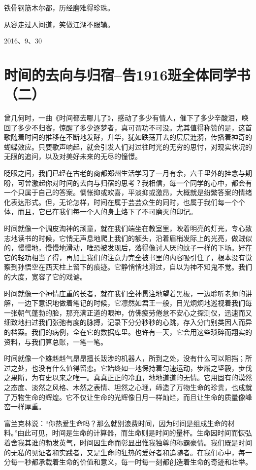 \documentclass[openany]{ctexbook}
\begin{document}
铁骨钢筋木尔都，历经磨难得珍珠。

从容走过人间道，笑傲江湖不服输。

2016、9、30

\chapter*{时间的去向与归宿--告1916班全体同学书（二）}\label{letter2}

曾几何时，一曲《时间都去哪儿了》，感动了多少有情人，催下了多少辛酸泪，唤回了多少不归客，惊醒了多少逐梦者，真可谓功不可没。尤其值得称赞的是，这首歌随着时间的推移在不断地发酵，升华，犹如跌荡开去的层层涟漪，传播着神奇的蝴蝶效应。只要歌声响起，就会引发人们对过往时光的无穷的思忖，对现实状况的无限的追问，以及对美好未来的无尽的憧憬。

眨眼之间，我们已经在古老的商都郑州生活学习了一月有余，六千里外的挂念与期盼，可曾激起你对时间的去向与归宿的思考？我相信，每一个同学的心中，都会有一个只属于自己的答案。惆怅抑或欢喜，平淡抑或激昂，大概就是纷繁答案的情绪化表达形式。但，无论怎样，时间在属于芸芸众生的同时，也属于我们每一个个体，而且，它已在我们每一个人的身上烙下了不可磨灭的印记。

时间就像一个调皮淘神的顽童，就在我们端坐在教室里，映着明亮的灯光，专心致志地读书的时候，它悄无声息地爬上我们的额头，沿着眉梢发际上的光亮，做贼似的，慢慢地，慢慢地滑动，唯恐被发现后，落得像讨人厌的蚊子一样的下场。好在它的轻功相当了得，再加上我们的注意力完全被书里的内容吸引住了，根本没有觉察到孙悟空在西天柱上留下的痕迹。它静悄悄地滑过，自以为神不知鬼不觉。我们的大度，宽容了它的戏谑。

时间就像一个神情庄重的长者，就在我们全神贯注地望着黑板，一边聆听老师的讲解，一边下意识地做着笔记的时候，它凛然如君王一般，目光炯炯地巡视着我们每一张朝气蓬勃的脸，那充满正道的眼神，仿佛疲劳倦怠不安心之探测仪，迅速而又细致地扫过我们张弛有度的脉搏，记录下分分秒秒的心跳，存入分门别类因人而异的档案。我们的病例，全在它的数据库里。也许有一天，它会用这些琐碎而翔实的资料，与我们算总账，一笔一笔。

时间就像一个雄赳赳气昂昂擅长跋涉的机器人，所到之处，没有什么可以阻挡；所过之处，也没有什么值得留恋。它始终如一地保持着匀速运动，步履之坚毅，步伐之果断，为有史以来之唯一。真真正正的冷血，地地道道的无情。它用固有的漠然之态度、淡然之风格、木然之表情、坦然之心理，缔造了万物生命的珍贵，也成就了万物生命的辉煌。它不仅让生命的光辉像日月一样灿烂，而且让生命的质量像峰峦一样厚重。

富兰克林说：``你热爱生命吗？那么就别浪费时间，因为时间是组成生命的材料。''由此可见，时间是生命的计算器，而生命则是时间的量杯。生命因时间而恢弘着舍我其谁的勃发英气，时间因生命而彰显出惟我独尊的称霸豪情。我们既是时间的无私的见证者和实践者，又是生命的狂热的爱好者和追随者。在我们心中，每一分每一秒都承载着生命的价值和意义，每一时每一刻都创造着生命的奇迹和壮举。
\end{document}
